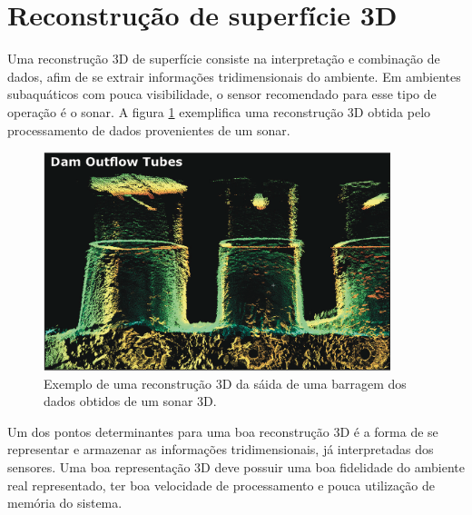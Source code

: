 
\section{Reconstrução de superfície 3D}

Uma reconstrução 3D de superfície consiste na interpretação e combinação de
dados, afim de se extrair informações tridimensionais do ambiente. Em ambientes
subaquáticos com pouca visibilidade, o sensor recomendado para esse tipo de
operação é o sonar. A figura \ref{figs/3d/3dcomporta} exemplifica uma
reconstrução 3D obtida pelo processamento de dados provenientes de um sonar.
\begin{figure}[H]
    \centering \includegraphics[width=0.9\textwidth]{figs/3d/3dcomporta}
    \caption{Exemplo de uma reconstrução 3D da sáida de uma barragem dos dados obtidos de um sonar 3D.}
    \label{figs/3d/3dcomporta}
\end{figure}


Um dos pontos determinantes para uma boa reconstrução 3D é a forma de se representar e armazenar as informações tridimensionais, já interpretadas dos sensores. Uma boa representação 3D deve possuir uma boa fidelidade do ambiente real representado, ter boa velocidade de processamento e pouca utilização de memória do sistema.


